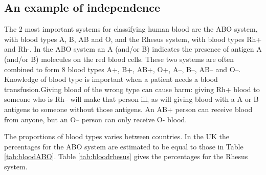 \documentclass[
  british,
]{book}
\begin{document}
\hypertarget{bloodindep}{%
\subsection{An example of independence}\label{bloodindep}}

The 2 most important systems for classifying human blood are the ABO system, with blood types A, B, AB and O, and the Rhesus system, with blood types Rh+ and Rh-. In the ABO system an A (and/or B) indicates the presence of antigen A (and/or B) molecules on the red blood cells. These two systems are often combined to form 8 blood types A+, B+, AB+, O+, A--, B--, AB-- and O--. Knowledge of blood type is important when a patient needs a blood transfusion.Giving blood of the wrong type can cause harm: giving Rh+ blood to someone who is Rh-- will make that person ill, as will giving blood with a A or B antigens to someone without those antigens. An AB+ person can receive blood from anyone, but an O-- person can only receive O- blood.

The proportions of blood types varies between countries. In the UK the percentages for the ABO system are estimated to be equal to those in Table \ref{tab:bloodABO}. Table \ref{tab:bloodrhesus} gives the percentages for the Rhesus system.

\FloatBarrier

 
  \providecommand{\huxb}[2]{\arrayrulecolor[RGB]{#1}\global\arrayrulewidth=#2pt}
  \providecommand{\huxvb}[2]{\color[RGB]{#1}\vrule width #2pt}
  \providecommand{\huxtpad}[1]{\rule{0pt}{#1}}
  \providecommand{\huxbpad}[1]{\rule[-#1]{0pt}{#1}}
\end{document}
